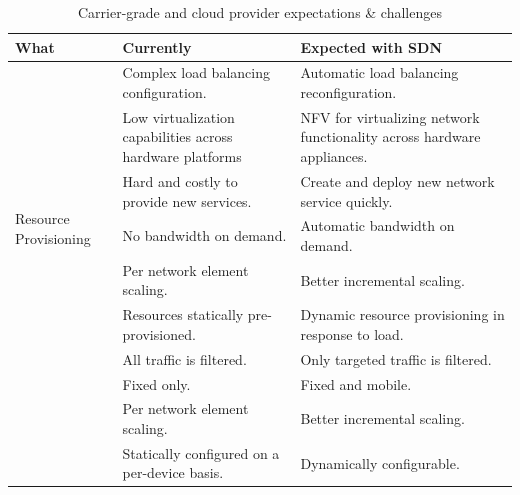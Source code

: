 {\renewcommand{\arraystretch}{1.4}
\begin{table}[t!]
\caption{Carrier-grade and cloud provider expectations \& challenges}
\label{tab:carriergradeneeds}
\newcommand{\firstcolumnwidth}{2.5cm} 
\begin{center}
\footnotesize
\begin{tabularx}{0.99\textwidth}{p{\firstcolumnwidth}p{6cm}X}
\hline
\textbf{What} & \textbf{Currently} & \textbf{Expected with SDN} \\\hline
\multirow{8}{*}{\begin{minipage}{\firstcolumnwidth}Resource Provisioning\end{minipage}} 
                     & Complex load balancing configuration. & Automatic load balancing reconfiguration.~\cite{elby2012,jain2013-1} \\\cline{2-3}
		    & Low virtualization capabilities across hardware platforms & NFV for virtualizing network functionality across hardware appliances.~\cite{tanner2013,atandtinc.2014} \\\cline{2-3}
		    & Hard and costly to provide new services. & Create and deploy new network service quickly.~\cite{tanner2013,atandtinc.2014}\\\cline{2-3}
                     & No bandwidth on demand. & Automatic bandwidth on demand.~\cite{onfsolutionbrief2013} \\\cline{2-3}
                     & Per network element scaling. & Better incremental scaling.~\cite{elby2012,staessens2011} \\\cline{2-3}
		    & Resources statically pre-provisioned. & Dynamic resource provisioning in response to load.~\cite{elby2012,jain2013-1,tanner2013,naudts2012,hong2013} \\
\hline
\multirow{4}{*}{\begin{minipage}{\firstcolumnwidth}Traffic Steering\end{minipage}} 
                     & All traffic is filtered. & Only targeted traffic is filtered.~\cite{elby2012} \\\cline{2-3}
                     & Fixed only. & Fixed and mobile.~\cite{elby2012} \\\cline{2-3}
                     & Per network element scaling. & Better incremental scaling. ~\cite{naudts2012,staessens2011}\\\cline{2-3}
                     & Statically configured on a per-device basis. & Dynamically configurable.~\cite{jain2013-1,onfsolutionbrief2013,anwer2013} \\

\end{tabularx}
\end{center}
\end{table}}
